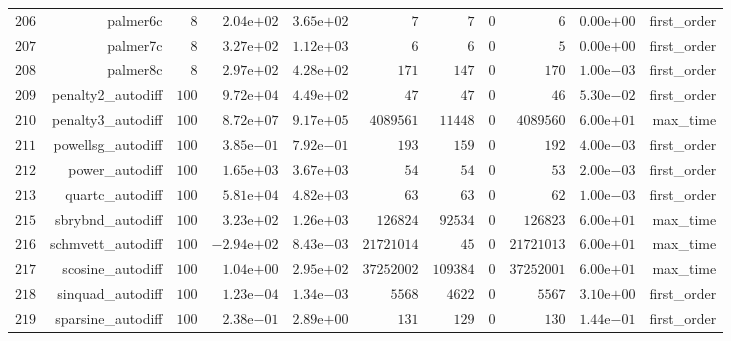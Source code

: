 \documentclass[varwidth=20cm,crop=true]{standalone}
\begin{document}
\begin{longtable}{rrrrrrrrrrr}
  \(   206\) & palmer6c & \(     8\) & \( 2.04\)e\(+02\) & \( 3.65\)e\(+02\) & \(     7\) & \(     7\) & \(     0\) & \(     6\) & \( 0.00\)e\(+00\) & first\_order \\
  \(   207\) & palmer7c & \(     8\) & \( 3.27\)e\(+02\) & \( 1.12\)e\(+03\) & \(     6\) & \(     6\) & \(     0\) & \(     5\) & \( 0.00\)e\(+00\) & first\_order \\
  \(   208\) & palmer8c & \(     8\) & \( 2.97\)e\(+02\) & \( 4.28\)e\(+02\) & \(   171\) & \(   147\) & \(     0\) & \(   170\) & \( 1.00\)e\(-03\) & first\_order \\
  \(   209\) & penalty2\_autodiff & \(   100\) & \( 9.72\)e\(+04\) & \( 4.49\)e\(+02\) & \(    47\) & \(    47\) & \(     0\) & \(    46\) & \( 5.30\)e\(-02\) & first\_order \\
  \(   210\) & penalty3\_autodiff & \(   100\) & \( 8.72\)e\(+07\) & \( 9.17\)e\(+05\) & \(4089561\) & \( 11448\) & \(     0\) & \(4089560\) & \( 6.00\)e\(+01\) & max\_time \\
  \(   211\) & powellsg\_autodiff & \(   100\) & \( 3.85\)e\(-01\) & \( 7.92\)e\(-01\) & \(   193\) & \(   159\) & \(     0\) & \(   192\) & \( 4.00\)e\(-03\) & first\_order \\
  \(   212\) & power\_autodiff & \(   100\) & \( 1.65\)e\(+03\) & \( 3.67\)e\(+03\) & \(    54\) & \(    54\) & \(     0\) & \(    53\) & \( 2.00\)e\(-03\) & first\_order \\
  \(   213\) & quartc\_autodiff & \(   100\) & \( 5.81\)e\(+04\) & \( 4.82\)e\(+03\) & \(    63\) & \(    63\) & \(     0\) & \(    62\) & \( 1.00\)e\(-03\) & first\_order \\
  \(   215\) & sbrybnd\_autodiff & \(   100\) & \( 3.23\)e\(+02\) & \( 1.26\)e\(+03\) & \(126824\) & \( 92534\) & \(     0\) & \(126823\) & \( 6.00\)e\(+01\) & max\_time \\
  \(   216\) & schmvett\_autodiff & \(   100\) & \(-2.94\)e\(+02\) & \( 8.43\)e\(-03\) & \(21721014\) & \(    45\) & \(     0\) & \(21721013\) & \( 6.00\)e\(+01\) & max\_time \\
  \(   217\) & scosine\_autodiff & \(   100\) & \( 1.04\)e\(+00\) & \( 2.95\)e\(+02\) & \(37252002\) & \(109384\) & \(     0\) & \(37252001\) & \( 6.00\)e\(+01\) & max\_time \\
  \(   218\) & sinquad\_autodiff & \(   100\) & \( 1.23\)e\(-04\) & \( 1.34\)e\(-03\) & \(  5568\) & \(  4622\) & \(     0\) & \(  5567\) & \( 3.10\)e\(+00\) & first\_order \\
  \(   219\) & sparsine\_autodiff & \(   100\) & \( 2.38\)e\(-01\) & \( 2.89\)e\(+00\) & \(   131\) & \(   129\) & \(     0\) & \(   130\) & \( 1.44\)e\(-01\) & first\_order \\

\end{longtable}
\end{document}
